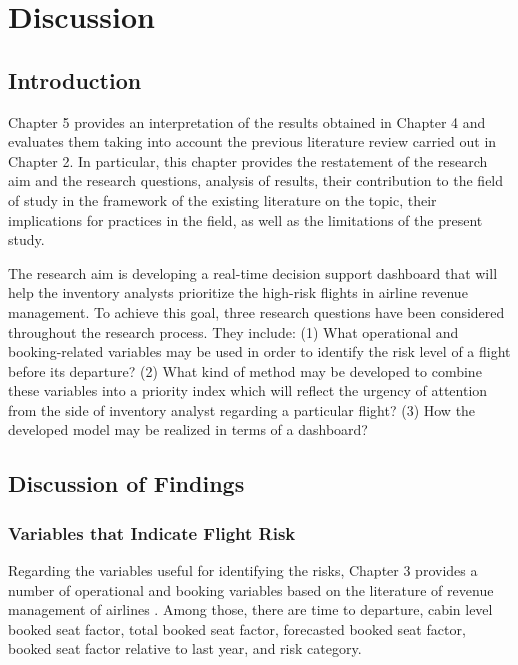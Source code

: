 \chapter{Discussion}
\label{ch:discussion}

\section{Introduction}

Chapter 5 provides an interpretation of the results obtained in Chapter 4 and evaluates them taking into account the previous literature review carried out in Chapter 2. In particular, this chapter provides the restatement of the research aim and the research questions, analysis of results, their contribution to the field of study in the framework of the existing literature on the topic, their implications for practices in the field, as well as the limitations of the present study.

The research aim is developing a real-time decision support dashboard that will help the inventory analysts prioritize the high-risk flights in airline revenue management. To achieve this goal, three research questions have been considered throughout the research process. They include: (1) What operational and booking-related variables may be used in order to identify the risk level of a flight before its departure? (2) What kind of method may be developed to combine these variables into a priority index which will reflect the urgency of attention from the side of inventory analyst regarding a particular flight? (3) How the developed model may be realized in terms of a dashboard?

\section{Discussion of Findings}



\subsection{Variables that Indicate Flight Risk}

Regarding the variables useful for identifying the risks, Chapter 3 provides a number of operational and booking variables based on the literature of revenue management of airlines \citep{Belobaba1987, Belobaba1989, LeeHersh1993, PakPiersma2002}. Among those, there are time to departure, cabin level booked seat factor, total booked seat factor, forecasted booked seat factor, booked seat factor relative to last year, and risk category.

